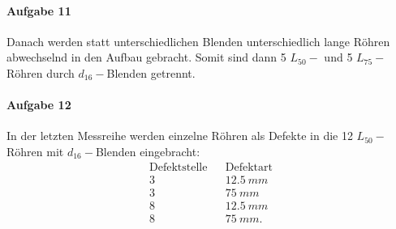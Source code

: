 \paragraph{Aufgabe 11}
Danach werden statt unterschiedlichen Blenden unterschiedlich lange Röhren abwechselnd in den Aufbau gebracht.
Somit sind dann 5 $L_{50}-$ und 5 $L_{75}-$ Röhren durch $d_{16}-$Blenden getrennt.
%
\paragraph{Aufgabe 12}
In der letzten Messreihe werden einzelne Röhren als Defekte in die 12 $L_{50}-$Röhren mit $d_{16}-$Blenden eingebracht:
\begin{align*}
\text{Defektstelle} && \text{Defektart}  \\
    3               &&   \SI{12.5}{mm}   \\
    3               &&   \SI{75}{mm}     \\
    8               &&   \SI{12.5}{mm}   \\
    8               &&   \SI{75}{mm}   . \\
\end{align*}
%
